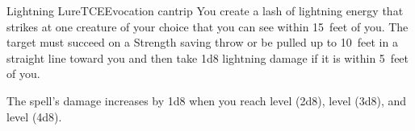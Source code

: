 \begin{spell}{Lightning Lure}{TCE}{Evocation cantrip}
{
}
You create a lash of lightning energy that strikes at one
creature of your choice that you can see within 15~feet of
you. The target must succeed on a Strength saving throw or
be pulled up to 10~feet in a straight line toward you and
then take 1d8 lightning damage if it is within 5~feet of
you.

 The spell's damage increases by
1d8 when you reach  level (2d8),  level (3d8),
and  level (4d8).
\end{spell}
